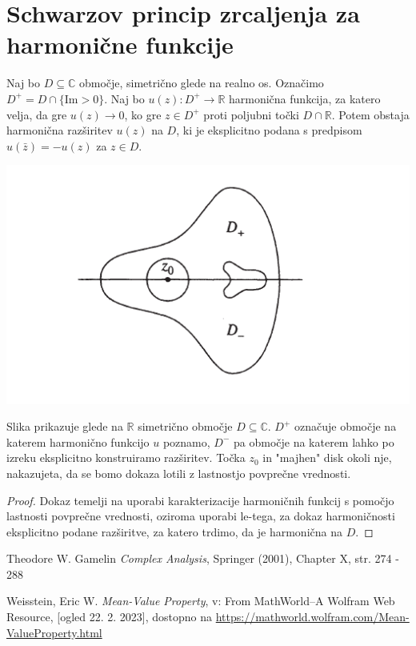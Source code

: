 \documentclass[mat1]{fmfdelo}
\newcommand{\R}{\mathbb R}
\newcommand{\C}{\mathbb C}
\begin{document}
\section{Schwarzov princip zrcaljenja za harmonične funkcije}
    \begin{izrek}
        Naj bo $D \subseteq \C$ območje, simetrično glede na realno os. 
        Označimo $D^{+} = D \cap \{\text{Im} > 0\}$. 
        Naj bo $u(z): D^{+} \to \mathbb{R}$ harmonična funkcija, za katero velja, da gre $u(z) \to 0$, ko gre $z \in D^{+}$ proti poljubni točki $D \cap \mathbb{R}$. 
        Potem obstaja harmonična razširitev $u(z)$ na $D$, ki je eksplicitno podana s predpisom $u(\bar{z}) = - u(z)$ za $z \in D$.
    \end{izrek}
    \begin{center}
        \includegraphics[width = 0.8 \textwidth]{schwarzov_princip_zrcaljenja.png}
    \end{center}
    Slika prikazuje glede na $\R$ simetrično območje $D \subseteq \C$. $D^{+}$ označuje  območje na katerem harmonično funkcijo $u$ poznamo, $D^{-}$ pa območje na katerem lahko po izreku eksplicitno konstruiramo razširitev.
    Točka $z_0$ in "majhen" disk okoli nje, nakazujeta, da se bomo dokaza lotili z lastnostjo povprečne vrednosti.
    \begin{proof}
        Dokaz temelji na uporabi karakterizacije harmoničnih funkcij s pomočjo lastnosti povprečne vrednosti, oziroma uporabi le-tega, za dokaz harmoničnosti eksplicitno podane razširitve, za katero trdimo, da je harmonična na $D$.
    \end{proof}

\newpage


\begin{thebibliography}{9}
    Theodore W. Gamelin \emph{Complex Analysis}, Springer (2001), Chapter X, str. 274 - 288

    Weisstein, Eric W. \emph{Mean-Value Property}, v: From MathWorld--A Wolfram Web Resource, [ogled 22. 2. 2023], dostopno na \href{https://mathworld.wolfram.com/Mean-ValueProperty.html}{https://mathworld.wolfram.com/Mean-ValueProperty.html}
\end{thebibliography}
\end{document}
